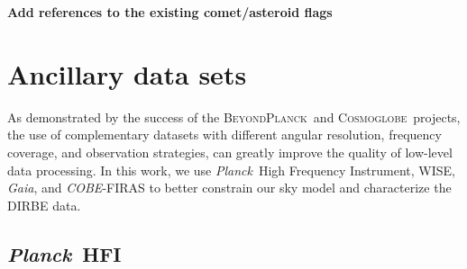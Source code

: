 \documentclass{aa}
\def\Planck{\textit{Planck}}
\def\COBE{\textit{COBE}}
\def\GAIA{\textit{Gaia}}
\def\WISE{WISE}
\newcommand{\bp}{\textsc{BeyondPlanck}}
\newcommand{\cosmoglobe}{\textsc{Cosmoglobe}}
\begin{document}
\textbf{Add references to the existing comet/asteroid flags}








\section{Ancillary data sets}
\label{sec:ancillary}

As demonstrated by the success of the \bp\ and \cosmoglobe\ projects, the use of complementary datasets with different angular resolution, frequency coverage, and observation strategies, can greatly improve the quality of low-level data processing. In this work, we use \Planck\ High Frequency Instrument, \WISE, \GAIA, and \COBE-FIRAS to better constrain our sky model and characterize the DIRBE data.


\subsection{\Planck\ HFI}
\end{document}
